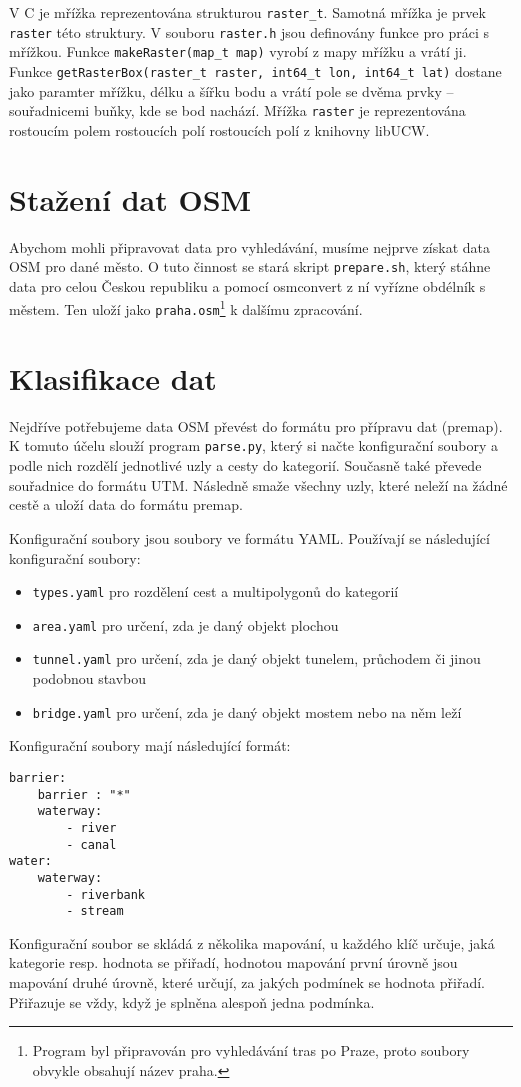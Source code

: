 V C je mřížka reprezentována strukturou \verb|raster_t|. Samotná mřížka je prvek
\verb|raster| této struktury. V souboru \verb|raster.h| jsou definovány funkce
pro práci s mřížkou. Funkce \verb|makeRaster(map_t map)| vyrobí z mapy mřížku a
vrátí ji. Funkce \verb|getRasterBox(raster_t raster, int64_t lon, int64_t lat)|
dostane jako paramter mřížku, délku a šířku bodu a vrátí pole se dvěma prvky --
souřadnicemi buňky, kde se bod nachází. Mřížka \verb|raster| je reprezentována
rostoucím polem rostoucích polí rostoucích polí z knihovny libUCW.

\medskip


\section{Stažení dat OSM}
Abychom mohli připravovat data pro vyhledávání, musíme nejprve získat data OSM
pro dané město. O tuto činnost se stará skript \verb|prepare.sh|, který stáhne
data pro celou Českou republiku a pomocí osmconvert z ní vyřízne obdélník s
městem. Ten uloží jako \verb|praha.osm|\footnote{Program byl připravován pro
vyhledávání tras po Praze, proto soubory obvykle obsahují název praha.} k
dalšímu zpracování.

\section{Klasifikace dat}
Nejdříve potřebujeme data OSM převést do formátu pro přípravu dat (premap). K
tomuto účelu slouží program \verb|parse.py|, který si načte konfigurační soubory
a podle nich rozdělí jednotlivé uzly a cesty do kategorií. Současně také převede
souřadnice do formátu UTM. Následně smaže všechny uzly, které neleží na žádné
cestě a uloží data do formátu premap.

Konfigurační soubory jsou soubory ve formátu YAML. Používají se následující
konfigurační soubory:
\begin{itemize}
	\item \verb|types.yaml| pro rozdělení cest a multipolygonů do
kategorií 
	\item \verb|area.yaml| pro určení, zda je daný objekt plochou
	\item \verb|tunnel.yaml| pro určení, zda je daný objekt tunelem,
	průchodem či jinou podobnou stavbou
	\item \verb|bridge.yaml| pro určení, zda je daný objekt mostem nebo na
	něm leží
\end{itemize}

Konfigurační soubory mají následující formát:
\begin{verbatim}
barrier: 
    barrier : "*"
    waterway:
        - river
        - canal
water:
    waterway:
        - riverbank
        - stream
\end{verbatim}
Konfigurační soubor se skládá z několika mapování, u každého klíč určuje, jaká
kategorie resp. hodnota se přiřadí, hodnotou mapování první úrovně jsou mapování
druhé úrovně, které určují, za jakých podmínek se hodnota přiřadí. Přiřazuje se
vždy, když je splněna alespoň jedna podmínka. 

